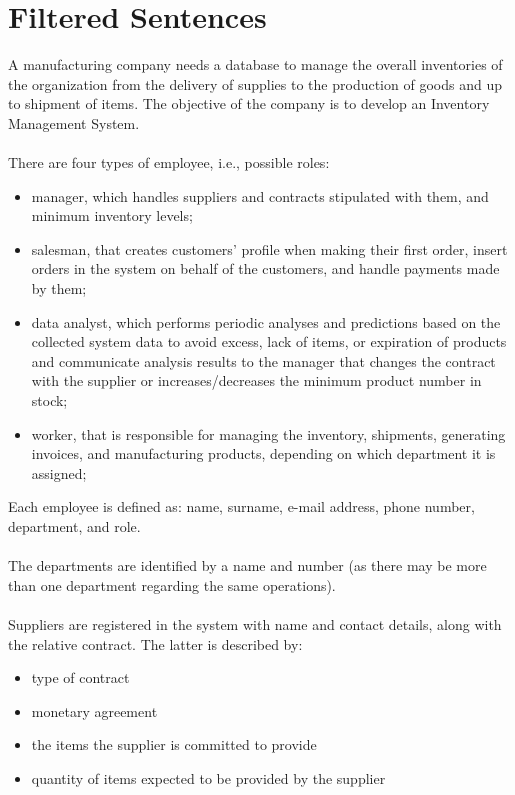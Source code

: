 \section{Filtered Sentences}

A manufacturing company needs a database to manage the overall inventories of the organization from the delivery of supplies to the production of goods and up to shipment of items. The objective of the company is to develop an Inventory Management System.\\\\
There are four types of employee, i.e., possible roles:
\begin{itemize}
	\item manager, which handles suppliers and contracts stipulated with them, and minimum inventory levels;
	\item salesman, that creates customers' profile when making their first order, insert orders in the system on behalf of the customers, and handle payments made by them;
	\item data analyst, which performs periodic analyses and predictions based on the collected system data to avoid excess, lack of items, or expiration of products and communicate analysis results to the manager that changes the contract with the supplier or increases/decreases the minimum product number in stock;
	\item worker, that is responsible for managing the inventory, shipments, generating invoices, and manufacturing products, depending on which department it is assigned;
\end{itemize}
\vspace{5pt}
Each employee is defined as: name, surname, e-mail address, phone number, department, and role.\\\\
The departments are identified by a name and number (as there may be more than one department regarding the same operations).\\\\
Suppliers are registered in the system with name and contact details, along with the relative contract. The latter is described by:
\begin{itemize}
	\item type of contract %
	\item monetary agreement
	\item the items the supplier is committed to provide
	\item quantity of items expected to be provided by the supplier
\end{itemize}
